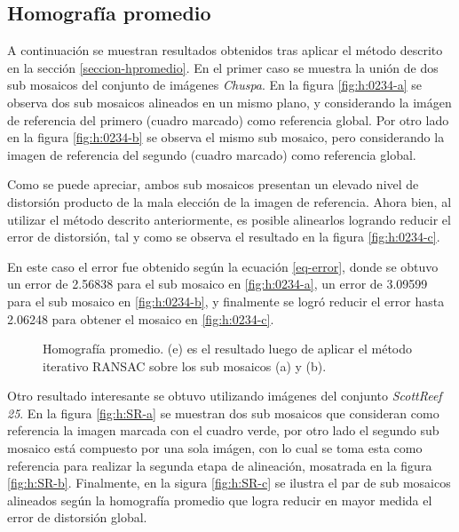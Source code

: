 \subsection*{Homografía promedio}

A continuación se muestran resultados obtenidos tras aplicar el método descrito en la sección \ref{seccion-hpromedio}. En el primer caso se muestra la unión de dos sub mosaicos del conjunto de imágenes \textit{Chuspa}. En la figura \ref{fig:h:0234-a} se observa dos sub mosaicos alineados en un mismo plano, y considerando la imágen de referencia del primero (cuadro marcado) como referencia global. Por otro lado en la figura \ref{fig:h:0234-b} se observa el mismo sub mosaico, pero considerando la imagen de referencia del segundo (cuadro marcado) como referencia global. 

Como se puede apreciar, ambos sub mosaicos presentan un elevado nivel de distorsión producto de la mala elección de la imagen de referencia. Ahora bien, al utilizar el método descrito anteriormente, es posible alinearlos logrando reducir el error de distorsión, tal y como se observa el resultado en la figura \ref{fig:h:0234-c}. 

En este caso el error fue obtenido según la ecuación \ref{eq-error}, donde se obtuvo un error de 2.56838 para el sub mosaico en \ref{fig:h:0234-a}, un error de 3.09599 para el sub mosaico en \ref{fig:h:0234-b}, y finalmente se logró reducir el error hasta 2.06248 para obtener el mosaico en \ref{fig:h:0234-c}.

\begin{figure}[h]
	\centering     %
	\hspace{1mm}%
	\hspace{1mm}%
	
	\caption[Homografía promedio: \textit{Mochima}]{Homografía promedio. (e) es el resultado luego de aplicar el método iterativo RANSAC sobre los sub mosaicos (a) y (b).}
	\label{imagen:avgh:0234}
\end{figure}

Otro resultado interesante se obtuvo utilizando imágenes del conjunto \textit{ScottReef 25}. En la figura \ref{fig:h:SR-a} se muestran dos sub mosaicos que consideran como referencia la imagen marcada con el cuadro verde, por otro lado el segundo sub mosaico está compuesto por una sola imágen, con lo cual se toma esta como referencia para realizar la segunda etapa de alineación, mosatrada en la figura \ref{fig:h:SR-b}. Finalmente, en la sigura \ref{fig:h:SR-c} se ilustra el par de sub mosaicos alineados según la homografía promedio que logra reducir en mayor medida el error de distorsión global. 

